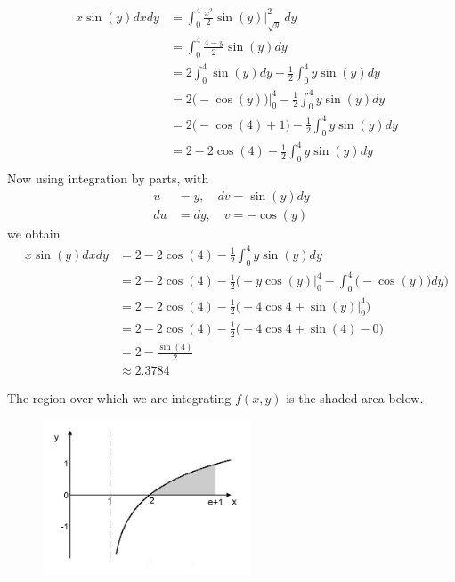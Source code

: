 \documentclass{article}
\begin{document}
\begin{align*} 
  \mathop{\int_0^4 \!\!\! \int_{\sqrt{y}}^{2} } x\sin (y) dxdy
  &= \int_0^4 \frac{x^2}{2}\sin(y)\Big|_{\sqrt{y}}^{2} \ dy \\
  &= \int_0^4 \frac{4-y}{2}\sin(y) dy \\
  &= 2 \int_0^4 \sin(y) dy - \frac{1}{2} \int_0^4 y\sin(y) dy \\
  &= 2 \big( - \cos(y) \big)\big|_0^4 - \frac{1}{2} \int_0^4 y\sin(y) dy \\
  &= 2 \big( - \cos(4) + 1 \big) - \frac{1}{2} \int_0^4 y\sin(y) dy \\
  &= 2  - 2\cos(4)  - \frac{1}{2} \int_0^4 y\sin(y) dy \\
\end{align*}
Now using integration by parts, with 
\begin{align*}
  u &= y, \quad dv = \sin(y)dy \\
  du &= dy, \quad v = -\cos(y)
\end{align*}
we obtain
\begin{align*} 
  \mathop{\int_0^4 \!\!\! \int_{\sqrt{y}}^{2} } x\sin (y) dxdy
  &= 2  - 2\cos(4)  - \frac{1}{2} \int_0^4 y\sin(y) dy \\
  &= 2  - 2\cos(4)  - \frac{1}{2}\Bigg( -y\cos(y)\Big|_0^4 - \int_0^4 \big(-\cos(y)\big) dy \Bigg) \\
  &= 2  - 2\cos(4)  - \frac{1}{2}\Bigg( -4\cos4 + \sin(y)\big|_0^4 \Bigg)  \\  
  &= 2  - 2\cos(4)  - \frac{1}{2}\Big( -4\cos4 + \sin(4)- 0 \Big)  \\  
  &= 2 - \frac{\sin(4)}{2}   \\  
  &\approx 2.3784
\end{align*}
\EEN
\item %
The region over which we are integrating $f(x,y)$ is the shaded area below. 
\begin{figure}[h]
  \vspace{-1pt}
  \begin{center}
    \includegraphics[width=0.55\textwidth]{ImgLog.jpg}
  \end{center}
\end{figure}\\
\end{document}
